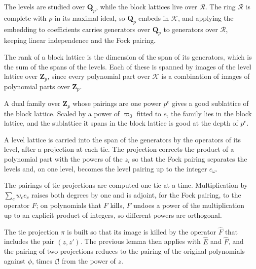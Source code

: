 The levels are studied over $\mathbf Q_p$, while the block lattices live over $\mathcal R$. The ring $\mathcal R$ is
complete with $p$ in its maximal ideal, so $\mathbf Q_p$ embeds in $\mathcal K$, and applying the embedding to
coefficients carries generators over $\mathbf Q_p$ to generators over $\mathcal R$, keeping linear independence
and the Fock pairing.

The rank of a block lattice is the dimension of the span of its generators, which is the sum of the spans
of the levels. Each of these is spanned by images of the level lattice over $\mathbf Z_p$, since every
polynomial part over $\mathcal K$ is a combination of images of polynomial parts over $\mathbf Z_p$.

A dual family over $\mathbf Z_p$ whose pairings are one power $p^e$ gives a good sublattice of the block
lattice. Scaled by a power of $\varpi_0$ fitted to $e$, the family lies in the block lattice, and the
sublattice it spans in the block lattice is good at the depth of $p^e$.

A level lattice is carried into the span of the generators by the operators of its level, after a projection
at each tie. The projection corrects the product of a polynomial part with the powers of the $z_l$ so that the
Fock pairing separates the levels and, on one level, becomes the level pairing up to the integer $c_\omega$.

The pairings of tie projections are computed one tie at a time. Multiplication by $\sum_cw_ce_c$ raises both
degrees by one and is adjoint, for the Fock pairing, to the operator $F$; on polynomials that $F$ kills, $F$ undoes
a power of the multiplication up to an explicit product of integers, so different powers are orthogonal.

The tie projection $\pi$ is built so that its image is killed by the operator $\hat F$ that includes the pair
$(z,z')$. The previous lemma then applies with $\hat E$ and $\hat F$, and the pairing of two projections reduces to
the pairing of the original polynomials against $\phi$, times $\zeta!$ from the power of $z$.

